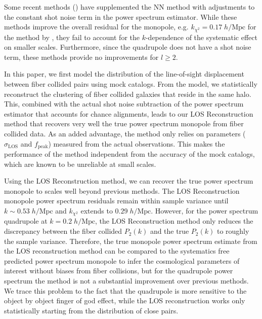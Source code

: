 Some recent methods (\citealt{Beutler:2014aa,Gil-Marin:2014aa,Beutler:2016aa,Grieb:2016aa,Gil-Marin:2016aa}) have supplemented
the NN method with adjustments to the constant shot noise term in the power spectrum 
estimator. While these methods improve the overall residual for the monopole, e.g. $k_{\chi^2}=0.17\;h/\mathrm{Mpc}$ for the method by \cite{Gil-Marin:2014aa}, they fail to account for the $k$-dependence of the systematic effect on smaller 
scales. Furthermore, since the quadrupole does not have a shot 
noise term, these methods provide no improvements for $l \geq 2$. 

In this paper, we first model the distribution of the line-of-sight displacement between 
fiber collided pairs using  mock catalogs. From the model, we statistically reconstruct the 
clustering of fiber collided galaxies that reside in the same halo. This, combined with the actual shot noise subtraction   
of the power spectrum estimator that accounts for chance alignments, 
leads to our LOS Reconstruction method that recovers very well the true power 
spectrum monopole from fiber collided data. As an added advantage, the method 
only relies on parameters ($\sigma_\mathrm{LOS}$ and $f_\mathrm{peak}$) 
measured from the actual observations. This makes the performance of the method 
independent from the accuracy of the mock catalogs, which are known to be unreliable 
at small scales. 

Using the LOS Reconstruction method, we can recover the true power 
spectrum monopole to scales well beyond previous methods. The LOS Reconstruction monopole power spectrum residuals remain within sample 
variance until $k \sim 0.53\;h/\mathrm{Mpc}$ and $k_{\chi^2}$ extends to  
$0.29\;h/\mathrm{Mpc}$. However, for the power spectrum quadrupole
at $k = 0.2\;h/\mathrm{Mpc}$,
the LOS Reconstruction method only reduces the discrepancy between the 
fiber collided $P_2(k)$ and the true $P_2(k)$ to roughly the sample variance. 
Therefore, the true monopole power spectrum estimate from 
the LOS reconstruction method can be compared to the systematics free predicted  
power spectrum monopole to infer the cosmological parameters of interest without 
biases from fiber collisions, but for the quadrupole power spectrum the method is not a substantial improvement over previous methods. We trace this problem  to the fact that the quadrupole is more sensitive to the object by object finger of god effect, while the LOS reconstruction works only statistically starting from the distribution of close pairs. 

